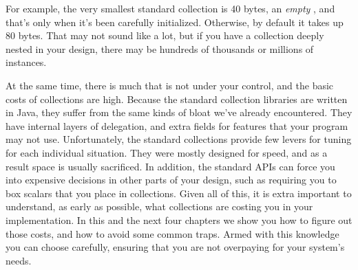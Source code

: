 For example,
the very smallest standard collection is 40 bytes, an \emph{empty}
, and that's only when it's been carefully initialized. 
Otherwise, by default it takes up 80 bytes. That may not sound like a lot,
but if you have a collection deeply nested in your design, there may be
hundreds of thousands or millions of instances.


At the same time, there is much that is not under your control, and the basic
costs of collections are high.  Because the standard collection libraries are
written in Java, they suffer from the same kinds of bloat we've already encountered. They have internal layers
of delegation, and extra fields for features that your program may not
use. Unfortunately, the standard collections provide few levers for
tuning for each individual situation. They were
mostly designed for speed, and as a result space is usually sacrificed. In
addition, the standard APIs can force you into expensive decisions in other
parts of your design, such as requiring you to box scalars that you place in
collections. Given all of this, it is extra important to understand, as early as possible,
what collections are costing you in your implementation. In this and
the next four chapters we show you how to figure out those costs, and how
to avoid some common traps. Armed with this
knowledge you can choose carefully, ensuring that you are not
overpaying for your system's needs.


